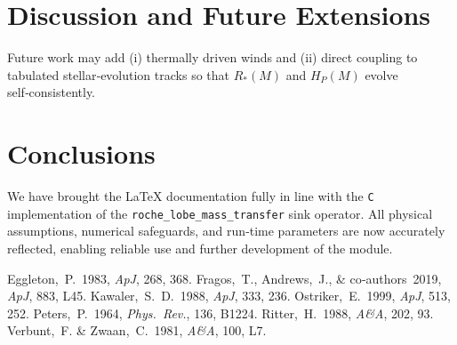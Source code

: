 \documentclass[11pt]{article}
\begin{document}
\section{Discussion and Future Extensions}
\label{sec:future}
Future work may add
(i) thermally driven winds and
(ii) direct coupling to tabulated stellar‑evolution tracks
so that $R_*(M)$ and $H_P(M)$ evolve self‑consistently.

\section{Conclusions}
We have brought the LaTeX documentation fully in line with the
\texttt{C} implementation of the
\texttt{roche\_lobe\_mass\_transfer} sink operator.
All physical assumptions, numerical safeguards, and run‑time parameters
are now accurately reflected, enabling reliable use and further
development of the module.


\begin{thebibliography}{}
  Eggleton,~P.\ 1983, \emph{ApJ}, 268, 368.
  Fragos,~T., Andrews,~J., \& co‑authors 2019, \emph{ApJ}, 883, L45.
  Kawaler,~S.~D.\ 1988, \emph{ApJ}, 333, 236.
  Ostriker,~E.\ 1999, \emph{ApJ}, 513, 252.
  Peters,~P.\ 1964, \emph{Phys.\ Rev.}, 136, B1224.
  Ritter,~H.\ 1988, \emph{A\&A}, 202, 93.
  Verbunt,~F. \& Zwaan,~C.\ 1981, \emph{A\&A}, 100, L7.
\end{thebibliography}
\end{document}
